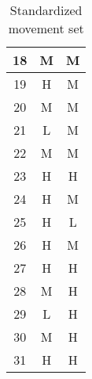 \begin{table}[h]
\begin{subtable}[t]{0.2\textwidth}
\begin{tabular}[t]{||c|c|c||}
      \hline
      18 & M & M \\
      \hline
      19 & H & M \\
      \hline
      20 & M & M \\
      \hline
      21 & L & M \\
      \hline
      22 & M & M \\
      \hline
      23 & H & H \\
      \hline
      24 & H & M \\
      \hline
      25 & H & L \\
      \hline
      26 & H & M \\
      \hline
      27 & H & H \\
      \hline
      28 & M & H \\
      \hline
      29 & L & H \\
      \hline
      30 & M & H \\
      \hline
      31 & H & H \\
      \hline
    \end{tabular}
    \end{subtable}
    \caption{Standardized movement set}
    \label{fig: standardized movement set}
\end{table}
